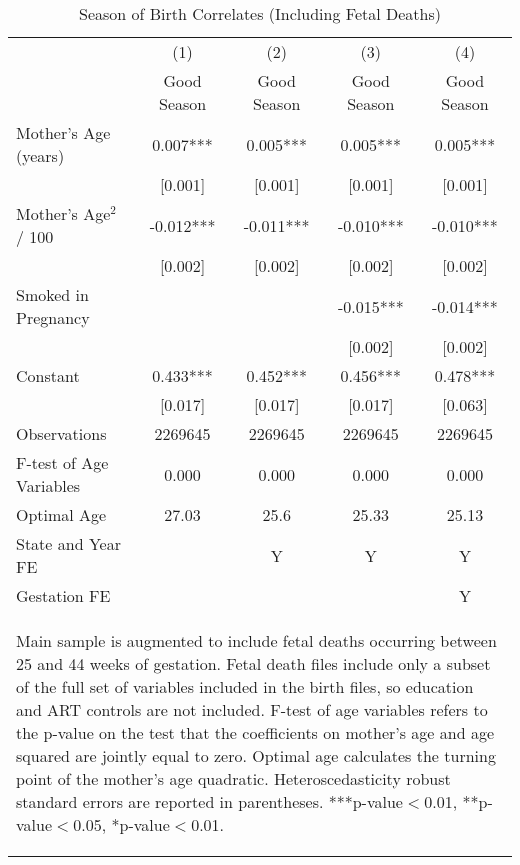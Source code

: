 \documentclass[a4paper, 11.5 pt]{article}
\theoremstyle{plain}
\begin{document}
\begin{doublespace}
\begin{table}[htbp]\centering
\def\sym#1{\ifmmode^{#1}\else\(^{#1}\)\fi}
\caption{Season of Birth Correlates (Including Fetal Deaths) \label{tab:FDeaths}}
\begin{tabular}{l*{4}{c}}
\toprule
                    &\multicolumn{1}{c}{(1)}   &\multicolumn{1}{c}{(2)}   &\multicolumn{1}{c}{(3)}   &\multicolumn{1}{c}{(4)}   \\
                    & Good Season   & Good Season   & Good Season   & Good Season   \\
\midrule
Mother's Age (years)&       0.007***&       0.005***&       0.005***&       0.005***\\
                    &     [0.001]   &     [0.001]   &     [0.001]   &     [0.001]   \\
Mother's Age$^2$ / 100&      -0.012***&      -0.011***&      -0.010***&      -0.010***\\
                    &     [0.002]   &     [0.002]   &     [0.002]   &     [0.002]   \\
Smoked in Pregnancy &               &               &      -0.015***&      -0.014***\\
                    &               &               &     [0.002]   &     [0.002]   \\
Constant            &       0.433***&       0.452***&       0.456***&       0.478***\\
                    &     [0.017]   &     [0.017]   &     [0.017]   &     [0.063]   \\
\midrule
Observations        &     2269645   &     2269645   &     2269645   &     2269645   \\
F-test of Age Variables&0.000&0.000&0.000&0.000 \\
Optimal Age &27.03&25.6&25.33&25.13 \\
State and Year FE&&Y&Y&Y\\  Gestation FE &&&&Y \\ \bottomrule
\multicolumn{5}{p{14cm}}{\begin{footnotesize}  Main sample is
augmented to include fetal deaths occurring between 25 and 44
weeks of gestation. Fetal death files include only a subset of the
full set of variables included in the birth files, so education and
 ART controls are not included. F-test of age variables refers to the p-value on the test that               the coefficients on mother's age and age squared are jointly               equal to zero. Optimal age calculates the turning point of the mother's age               quadratic. Heteroscedasticity robust standard errors are reported in               parentheses.
***p-value$<$0.01, **p-value$<$0.05, *p-value$<$0.01.
\end{footnotesize}}\end{tabular}\end{table}


\end{doublespace}
\end{document}
